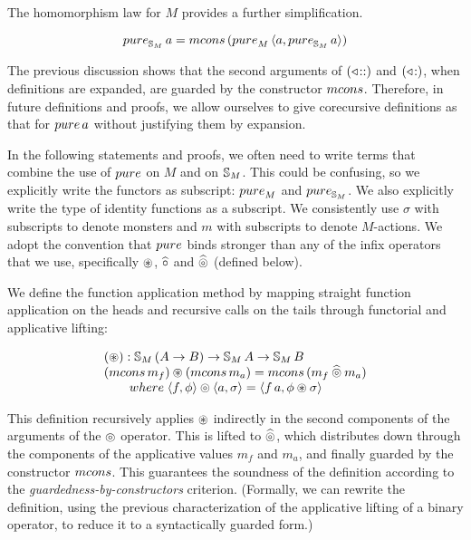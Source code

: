 The homomorphism law for $M$ provides a further simplification.
\begin{lemma}\label{lemma:monster_pure} 
$$
\apure_{\stream{M}}\,a = \mcons\,(\apure_M\,\langle a, \apure_{\stream{M}}\,a\rangle)
$$
\end{lemma}

The previous discussion shows that the second arguments of $(\mathbin{\triangleleft\!::})$ and $(\mathbin{\triangleleft\!:})$, when definitions are expanded, are guarded by the constructor $\mcons$.
Therefore, in future definitions and proofs, we allow ourselves to give corecursive definitions as that for $\apure\,a$ without justifying them by expansion.

In the following statements and proofs, we often need to write terms that combine the use of $\apure$ on $M$ and on $\mathbb{S}_{M}$.
This could be confusing, so we explicitly write the functors as subscript: $\apure_M$ and $\apure_{\stream{M}}$.
We also explicitly write the type of identity functions as a subscript.
We consistently use $\sigma$ with subscripts to denote monsters and $m$ with subscripts to denote $M$-actions.
We adopt the convention that $\apure$ binds stronger than any of the infix operators that we use, specifically $\circledast$, $\mathbin{\widehat{\circ}}$ and $\mathbin{\widehat{\circledcirc}}$ (defined below).


We define the function application method by mapping straight function application on the heads and recursive calls on the tails through functorial and applicative lifting:

$$
\begin{array}{l}
(\appl) : \stream{M}\,(A\rightarrow B) \rightarrow \stream{M}\,A \rightarrow \stream{M}\,B\\
(\mcons\,m_f) \appl (\mcons\,m_a)
= \mcons\,(m_f \alift{\pappl} m_a)\\
\qquad \where\;
\langle f,\phi\rangle \pappl \langle a,\sigma\rangle 
= \langle f\,a, \phi \appl \sigma \rangle
\end{array}
$$

This definition recursively applies $\circledast$ indirectly in the second components of the arguments of the $\circledcirc$ operator.
This is lifted to $\mathbin{\widehat{\circledcirc}}$, which distributes down through the components of the applicative values $m_f$ and $m_a$, and finally guarded by the constructor $\mcons$.
This guarantees the soundness of the definition according to the {\em guardedness-by-constructors} criterion.
(Formally, we can rewrite the definition, using the previous characterization of the applicative lifting of a binary operator, to reduce it to a syntactically guarded form.)

